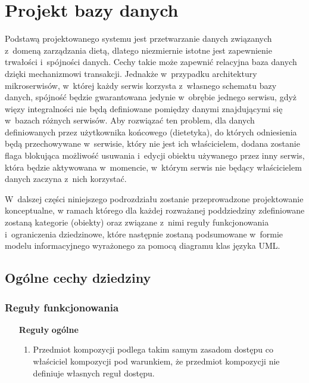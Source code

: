 
\section{Projekt bazy danych}\label{sec:database}

Podstawą projektowanego systemu jest przetwarzanie danych związanych z~domeną zarządzania dietą, dlatego niezmiernie istotne jest zapewnienie trwałości i~spójności danych.
Cechy takie może zapewnić relacyjna baza danych dzięki mechanizmowi transakcji\cite{book:bazury}.
Jednakże w~przypadku architektury mikroserwisów, w~której każdy serwis korzysta z~własnego schematu bazy danych, spójność będzie gwarantowana jedynie w~obrębie jednego serwisu,
gdyż więzy integralności nie będą definiowane pomiędzy danymi znajdującymi się w~bazach różnych serwisów.
Aby rozwiązać ten problem, dla danych definiowanych przez użytkownika końcowego (dietetyka), do których odniesienia będą przechowywane w~serwisie, który nie jest ich właścicielem,
dodana zostanie flaga blokująca możliwość usuwania i~edycji obiektu używanego przez inny serwis, która będzie aktywowana w~momencie, w~którym serwis nie będący właścicielem danych zaczyna z~nich korzystać.

\par
W~dalszej części niniejszego podrozdziału zostanie przeprowadzone projektowanie konceptualne,
w ramach którego dla każdej rozważanej poddziedziny zdefiniowane zostaną kategorie (obiekty) oraz związane z~nimi reguły funkcjonowania i~ograniczenia dziedzinowe\cite{book:bazury},
które następnie zostaną podsumowane w~formie modelu informacyjnego wyrażonego za pomocą diagramu klas języka UML.

\pagebreak %

\subsection{Ogólne cechy dziedziny}\label{ssubsubsec:database:domain}
\subsubsection{Reguły funkcjonowania}\label{subsubsec:database:domain:functionalRules}
\begin{itemize}[label={\textbf{Reguły dla}}, wide, labelwidth=!, labelindent=0pt]
    \setlength\itemsep{1.75em}
    \item[\textbf{Reguły}] \textbf{ogólne}
    \begin{enumerate}[label={\textbf{REG/0/\protect\twodigits{\arabic{enumi}}}}, wide, labelwidth=!, align=left, leftmargin=3cm]
        \item Przedmiot kompozycji podlega takim samym zasadom dostępu co właściciel kompozycji pod warunkiem, że przedmiot kompozycji nie definiuje własnych reguł dostępu.
    \end{enumerate}
\end{itemize}

